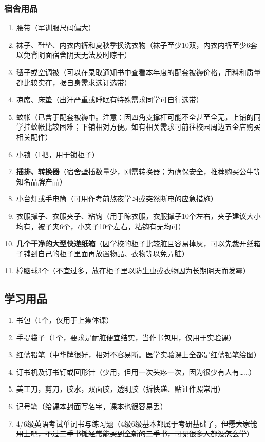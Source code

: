 \subsubsection[宿舍用品]{宿舍用品}
\begin{enumerate}
    \item 腰带（军训服尺码偏大）
    \item 袜子、鞋垫、内衣内裤和夏秋季换洗衣物（袜子至少10双，内衣内裤至少6套以免背阴面宿舍阴天无法及时晾干）
    \item 毯子或空调被（可以在录取通知书中查看本年度的配套被褥\footnotemark 价格，用料和质量都比较实在，据自身需求选订选带）
    \item 凉席、床垫\footnotemark（出汗严重或睡眠有特殊需求同学可自行选带）
    \item 蚊帐（已含于配套被褥中。注意：因四角支撑杆可能不全甚至全无，上铺的同学挂蚊帐比较困难；下铺相对方便。如有相关需求可前往校园周边五金店购买相关配件）
    \item 小锁（1把，用于锁柜子）
    \item \textbf{插排、转换器}（宿舍壁插数量少，刚需转换器；为确保安全，推荐购买公牛等知名品牌产品）
    \item 小台灯或手电筒（可用作考前熬夜学习或突然断电的应急措施）
    \item 衣服撑子、衣服夹子、粘钩（用于晾衣服，衣服撑子10个左右，夹子建议大小均有，被子夹6个，小夹子10个左右，粘钩有无均可）
    \item \textbf{几个干净的大型快递纸箱}（因学校的柜子比较脏且容易掉灰，可以先裁开纸箱子铺到自己的柜子里面再放置物品、衣物等以免弄脏）
    \item 樟脑球3个（不宜过多，放在柜子里以防生虫或衣物因为长期阴天而发霉）
\end{enumerate}

\subsection[学习用品]{学习用品}
\begin{enumerate}
    \item 书包（1个，仅用于上集体课）
    \item 手提袋子（1个，要求是耐脏便宜结实，当作书包用，仅用于实验课\footnotemark）
    \item 红蓝铅笔（中华牌很好，相对不容易断。医学实验课上全都是红蓝铅笔绘图）
    \item 订书机及订书钉或回形针（少用，\sout{但用一次头疼一次，因为很少有人有……}）
    \item 美工刀，剪刀，胶水，双面胶，透明胶（拆快递、贴证件照常用）
    \item 记号笔（给课本封面写名字，课本也很容易丢）
    \item 4/6级英语考试单词书与练习题（4级6级基本都属于考研基础了，\sout{但愿大家能用上吧，不过\linebreak[3]二手书摊经常能买到全新的二手书，可见很多人都没怎么学}）
\end{enumerate}

